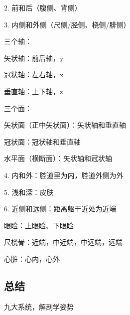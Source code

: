 2. 前和后（腹侧、背侧）

3. 内侧和外侧（尺侧/胫侧、桡侧/腓侧）
\begin{notation}
    三个轴：

    矢状轴：前后轴，y

    冠状轴：左右轴，x

    垂直轴：上下轴，z

    三个面：

    矢状面（正中矢状面）：矢状轴和垂直轴

    冠状面：冠状轴和垂直轴

    水平面（横断面）：矢状轴和冠状轴
\end{notation}
4. 内和外：腔道里为内，腔道外侧为外

5. 浅和深：皮肤

6. 近侧和远侧：距离躯干近处为近端
\begin{eg}
    眼睑：上眼睑、下眼睑

    尺桡骨：近端，中近端，中远端，远端

    心脏：心内，心外
\end{eg}
\subsection{总结}%
\label{sub:总结}
九大系统，解剖学姿势

















































